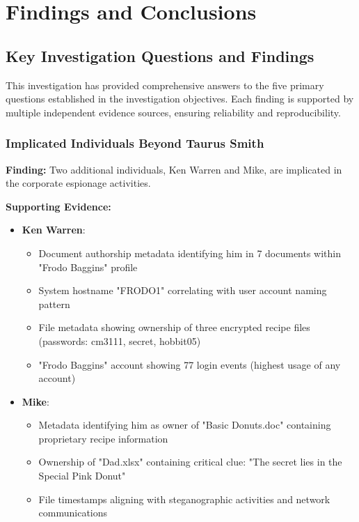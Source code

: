 \chapter{Findings and Conclusions}

\section{Key Investigation Questions and Findings}
This investigation has provided comprehensive answers to the five primary questions established in the investigation objectives. Each finding is supported by multiple independent evidence sources, ensuring reliability and reproducibility.

\subsection{Implicated Individuals Beyond Taurus Smith}
\textbf{Finding:} Two additional individuals, Ken Warren and Mike, are implicated in the corporate espionage activities.

\textbf{Supporting Evidence:}
\begin{itemize}
    \item \textbf{Ken Warren}: 
        \begin{itemize}
            \item Document authorship metadata identifying him in 7 documents within "Frodo Baggins" profile
            \item System hostname "FRODO1" correlating with user account naming pattern
            \item File metadata showing ownership of three encrypted recipe files (passwords: cm3111, secret, hobbit05)
            \item "Frodo Baggins" account showing 77 login events (highest usage of any account)
        \end{itemize}
    \item \textbf{Mike}:
        \begin{itemize}
            \item Metadata identifying him as owner of "Basic Donuts.doc" containing proprietary recipe information
            \item Ownership of "Dad.xlsx" containing critical clue: "The secret lies in the Special Pink Donut"
            \item File timestamps aligning with steganographic activities and network communications
        \end{itemize}
\end{itemize}

